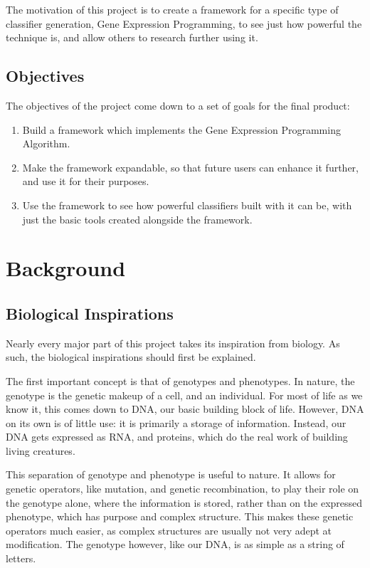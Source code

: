 \documentclass[a4paper,11pt]{report}
\begin{document}
The motivation of this project is to create a framework for a specific type of classifier
generation, Gene Expression Programming, to see just how powerful the technique is, and 
allow others to research further using it.

\section{Objectives}

The objectives of the project come down to a set of goals for the final product:

\begin{enumerate}
 \item Build a framework which implements the Gene Expression Programming Algorithm.
 \item Make the framework expandable, so that future users can enhance it further, and use it for their purposes. 
 \item Use the framework to see how powerful classifiers built with it can be, with just the basic tools created
alongside the framework. 
\end{enumerate}

\chapter{Background}

\section{Biological Inspirations}

Nearly every major part of this project takes its inspiration from biology. As such, the biological inspirations 
should first be explained. 

The first important concept is that of genotypes and phenotypes. In nature, the genotype is the genetic makeup 
of a cell, and an individual. For most of life as we know it, this comes down to DNA, our basic building block 
of life. However, DNA on its own is of little use: it is primarily a storage of information. 
Instead, our DNA gets expressed as RNA, and proteins, which do the real work of building living creatures. 

This separation of genotype and phenotype is useful to nature. It allows for genetic operators, like 
mutation, and genetic recombination, to play their 
role on the genotype alone, where the information is stored, rather than on the expressed phenotype, which 
has purpose and complex structure. This makes these genetic operators much easier, as complex structures 
are usually not very adept at modification. The genotype however, like our DNA, is as simple as a string 
of letters. 
\end{document}
